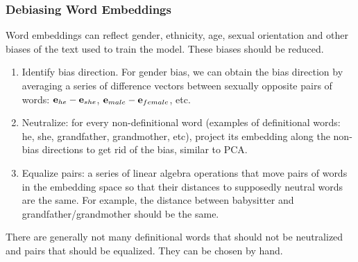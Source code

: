 \subsubsection{Debiasing Word Embeddings}
Word embeddings can reflect gender, ethnicity, age, sexual orientation and other biases of the text used to train the model. These biases should be reduced.
\begin{enumerate}
  \item Identify bias direction. For gender bias, we can obtain the bias direction by averaging a series of difference vectors between sexually opposite pairs of words: $\mathbf{e}_{he}-\mathbf{e}_{she}$, $\mathbf{e}_{male}-\mathbf{e}_{female}$, etc.
  \item Neutralize: for every non-definitional word (examples of definitional words: he, she, grandfather, grandmother, etc), project its embedding along the non-bias directions to get rid of the bias, similar to PCA.
  \item Equalize pairs: a series of linear algebra operations that move pairs of words in the embedding space so that their distances to supposedly neutral words are the same. For example, the distance between babysitter and grandfather/grandmother should be the same.
\end{enumerate}
There are generally not many definitional words that should not be neutralized and pairs that should be equalized. They can be chosen by hand.
\ifx\PREAMBLE\undefined

\fi